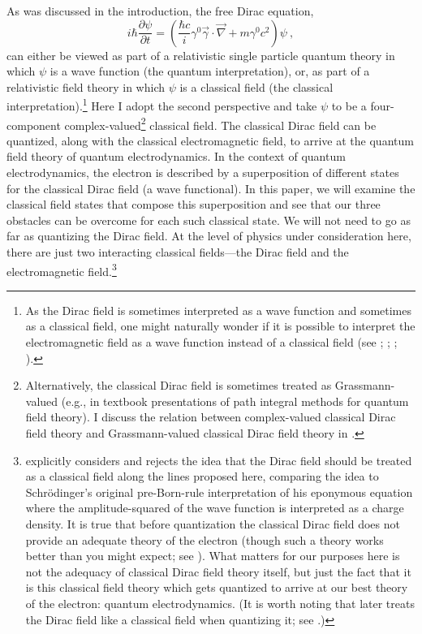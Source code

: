 \documentclass[onecolumn,secnumarabic,amsmath,amssymb,balancelastpage,nofootinbib]{article}
\begin{document}
As was discussed in the introduction, the free Dirac equation,
\begin{equation}
i\hbar \frac{\partial \psi}{\partial t}=\left(\frac{\hbar c}{i}\gamma^0 \vec{\gamma}\cdot\vec{\nabla}+m\gamma^0 c^2\right)\psi
\ ,
\label{thediracequation}
\end{equation}
can either be viewed as part of a relativistic single particle quantum theory in which $\psi$ is a wave function (the quantum interpretation), or, as part of a relativistic field theory in which $\psi$ is a classical field (the classical interpretation).\footnote{As the Dirac field is sometimes interpreted as a wave function and sometimes as a classical field, one might naturally wonder if it is possible to interpret the electromagnetic field as a wave function instead of a classical field  (see \citealp{good1957}; \citealp{mignani1974}; \citealp{bialynicki1996}; \citealp{emasqp}).}  Here I adopt the second perspective and take $\psi$ to be a four-component complex-valued\footnote{Alternatively, the classical Dirac field is sometimes treated as Grassmann-valued (e.g., in textbook presentations of path integral methods for quantum field theory).  I discuss the relation between complex-valued classical Dirac field theory and Grassmann-valued classical Dirac field theory in \citet{positronpaper}.} classical field.  The classical Dirac field can be quantized, along with the classical electromagnetic field, to arrive at the quantum field theory of quantum electrodynamics.  In the context of quantum electrodynamics, the electron is described by a superposition of different states for the classical Dirac field (a wave functional).  In this paper, we will examine the classical field states that compose this superposition and see that our three obstacles can be overcome for each such classical state.  We will not need to go as far as quantizing the Dirac field.  At the level of physics under consideration here, there are just two interacting classical fields---the Dirac field and the electromagnetic field.\footnote{\citet[pg.\ 216--217]{weyl} explicitly considers and rejects the idea that the Dirac field should be treated as a classical field along the lines proposed here, comparing the idea to Schr\"{o}dinger's original pre-Born-rule interpretation of his eponymous equation where the amplitude-squared of the wave function is interpreted as a charge density.  It is true that before quantization the classical Dirac field does not provide an adequate theory of the electron (though such a theory works better than you might expect; see \citealp{crisp1969,jaynes1973,barut1988, barut1990}).  What matters for our purposes here is not the adequacy of classical Dirac field theory itself, but just the fact that it is this classical field theory which gets quantized to arrive at our best theory of the electron: quantum electrodynamics.  (It is worth noting that \citealp{weyl} later treats the Dirac field like a classical field when quantizing it; see \citealp[pg.\ 451]{pashby2012}.)}
\end{document}
